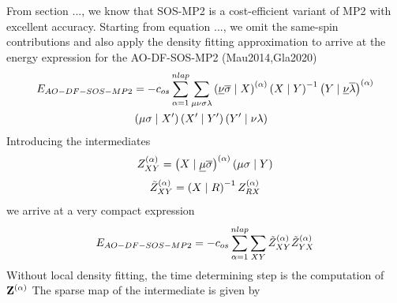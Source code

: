 From section ..., we know that SOS-MP2 is a cost-efficient variant of MP2 with excellent accuracy. Starting from equation ..., we omit the same-spin contributions and also apply the density fitting approximation to arrive at the energy expression for the AO-DF-SOS-MP2 (Mau2014,Gla2020)
\begin{equation}
\begin{split}
E_{AO-DF-SOS-MP2} &= - c_{os} \sum^{nlap}_{\alpha=1} \sum_{\mu\nu\sigma\lambda} \left( \underline{\nu}\overline{\sigma} \mid X \right)^{(\alpha)} \left( X \mid Y \right)^{-1} \left( Y \mid \underline{\nu}\overline{\lambda} \right)^{(\alpha)} \\
& \left( \mu\sigma \mid X' \right) \left( X' \mid Y' \right) \left( Y' \mid \nu\lambda \right)
\end{split}
\end{equation}
\noindent Introducing the intermediates
\begin{equation}
Z^{(\alpha)}_{XY} = \left( X \mid \underline{\mu}\overline{\sigma} \right)^{(\alpha)} \left( \mu\sigma \mid Y \right)
\end{equation}
\begin{equation}
\tilde{Z}^{(\alpha)}_{XY} = \left( X \mid R \right)^{-1} Z^{(\alpha)}_{RX}
\end{equation}
\noindent we arrive at a very compact expression
\begin{equation}
E_{AO-DF-SOS-MP2} = - c_{os} \sum^{nlap}_{\alpha=1} \sum_{XY} \tilde{Z}^{(\alpha)}_{XY} \tilde{Z}^{(\alpha)}_{YX} 
\end{equation}
\noindent Without local density fitting, the time determining step is the computation of $\mathbf{Z}^{(\alpha)}$ The sparse map of the intermediate is given by 
\begin{center}
\end{center}
